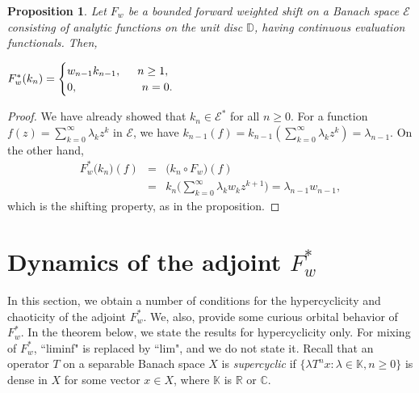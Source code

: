 \documentclass[12pt, reqno]{amsart}
\newtheorem{proposition}[theorem]{Proposition}
\theoremstyle{definition}
\theoremstyle{remark}
\numberwithin{equation}{section}
\begin{document}
\begin{proposition} \label{uni-shift}
Let $F_w$ be a bounded forward weighted shift on a Banach space $\mathcal{E}$ consisting of analytic functions on the unit disc $\mathbb{D}$, having continuous evaluation functionals. Then,
\begin{center}  
$F_w^*(k_n)=
\begin{cases}
    w_{n-1}k_{n-1}, \hskip.5cm n\geq 1,\\ 0,\hskip 2cm n=0.
\end{cases}$
\end{center}
\end{proposition}
\begin{proof}
 We have already showed that $k_n\in \mathcal{E}^*$ for all $n\geq 0$. For a function $f(z)=\sum_{k=0}^{\infty}\lambda_{k}z^{k}$ in $\mathcal{E}$, we have $k_{n-1}(f)=k_{n-1}\left( \sum_{k=0}^{\infty}\lambda_{k}z^{k}\right)=\lambda_{n-1}.$ On the other hand,
 \begin{eqnarray*}
  F_{w}^{*}\big(k_{n}\big)(f)&=&\big(k_{n}\circ F_{w}\big)(f)\\&=&k_{n}\big(\sum_{k=0}^{\infty} \lambda_{k}w_{k}z^{k+1}\big)=\lambda_{n-1}w_{n-1},
 \end{eqnarray*}
 which is the shifting property, as in the proposition.
\end{proof}

\section{Dynamics of the adjoint $F_w^*$}
In this section, we obtain a number of conditions for the hypercyclicity and chaoticity of the adjoint $F_w^*$. We, also, provide some curious orbital behavior of $F_w^*$. In the theorem below, we state the results for hypercyclicity only. For mixing of $F_w^*$, ``liminf" is replaced by ``lim", and we do not state it. Recall that an operator $T$ on a separable Banach space $X$ is \textit{supercyclic} if $\{\lambda T^nx:\lambda \in \mathbb{K}, n\geq 0\}$ is dense in $X$ for some vector $x\in X$, where $\mathbb{K}$ is $\mathbb{R}$ or $\mathbb{C}$. 
\end{document}
